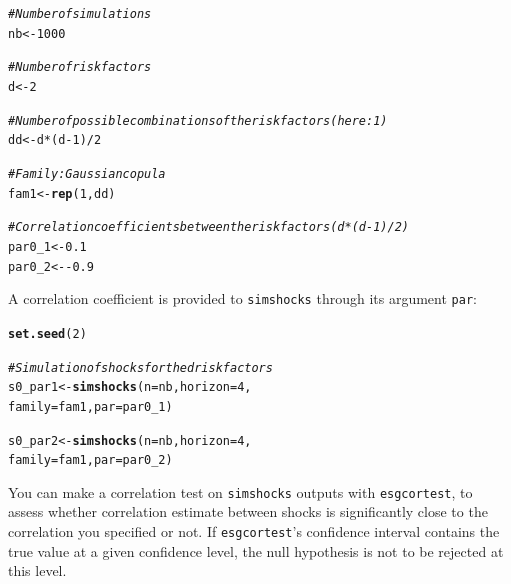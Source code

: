 \documentclass[a4paper]{article}\usepackage[]{graphicx}\usepackage[]{color}
\makeatletter
\newcommand{\hlnum}[1]{\textcolor[rgb]{0.686,0.059,0.569}{#1}}%
\newcommand{\hlcom}[1]{\textcolor[rgb]{0.678,0.584,0.686}{\textit{#1}}}%
\newcommand{\hlopt}[1]{\textcolor[rgb]{0,0,0}{#1}}%
\newcommand{\hlstd}[1]{\textcolor[rgb]{0.345,0.345,0.345}{#1}}%
\newcommand{\hlkwb}[1]{\textcolor[rgb]{0.69,0.353,0.396}{#1}}%
\newcommand{\hlkwc}[1]{\textcolor[rgb]{0.333,0.667,0.333}{#1}}%
\newcommand{\hlkwd}[1]{\textcolor[rgb]{0.737,0.353,0.396}{\textbf{#1}}}%
\newenvironment{kframe}{%
 \def\at@end@of@kframe{}%
 \ifinner\ifhmode%
  \def\at@end@of@kframe{\end{minipage}}%
  \begin{minipage}{\columnwidth}%
 \fi\fi%
 \def\FrameCommand##1{\hskip\@totalleftmargin \hskip-\fboxsep
 \colorbox{shadecolor}{##1}\hskip-\fboxsep
     \hskip-\linewidth \hskip-\@totalleftmargin \hskip\columnwidth}%
 \MakeFramed {\advance\hsize-\width
   \@totalleftmargin\z@ \linewidth\hsize
   \@setminipage}}%
 {\par\unskip\endMakeFramed%
 \at@end@of@kframe}
\newenvironment{knitrout}{}{} %
\newcommand{\code}[1]{\mbox{\texttt{#1}}}
\makeatother
\begin{document}
\begin{knitrout}
\color{fgcolor}\begin{kframe}
\begin{alltt}
\hlcom{# Number of simulations}
\hlstd{nb} \hlkwb{<-} \hlnum{1000}

\hlcom{# Number of risk factors}
\hlstd{d} \hlkwb{<-} \hlnum{2}

\hlcom{# Number of possible combinations of the risk factors (here : 1)}
\hlstd{dd} \hlkwb{<-} \hlstd{d}\hlopt{*}\hlstd{(d}\hlopt{-}\hlnum{1}\hlstd{)}\hlopt{/}\hlnum{2}

\hlcom{# Family : Gaussian copula }
\hlstd{fam1} \hlkwb{<-} \hlkwd{rep}\hlstd{(}\hlnum{1}\hlstd{, dd)}

\hlcom{# Correlation coefficients between the risk factors (d*(d-1)/2)}
\hlstd{par0_1} \hlkwb{<-} \hlnum{0.1}
\hlstd{par0_2} \hlkwb{<-} \hlopt{-}\hlnum{0.9}
\end{alltt}
\end{kframe}
\end{knitrout}


A correlation coefficient is provided to \code{simshocks} through its argument \code{par}:

\begin{knitrout}
\color{fgcolor}\begin{kframe}
\begin{alltt}
\hlkwd{set.seed}\hlstd{(}\hlnum{2}\hlstd{)}

\hlcom{# Simulation of shocks for the d risk factors}
\hlstd{s0_par1} \hlkwb{<-} \hlkwd{simshocks}\hlstd{(}\hlkwc{n} \hlstd{= nb,} \hlkwc{horizon} \hlstd{=} \hlnum{4}\hlstd{,}
\hlkwc{family} \hlstd{= fam1,} \hlkwc{par} \hlstd{= par0_1)}

\hlstd{s0_par2} \hlkwb{<-} \hlkwd{simshocks}\hlstd{(}\hlkwc{n} \hlstd{= nb,} \hlkwc{horizon} \hlstd{=} \hlnum{4}\hlstd{,}
\hlkwc{family} \hlstd{= fam1,} \hlkwc{par} \hlstd{= par0_2)}
\end{alltt}
\end{kframe}
\end{knitrout}

You can make a correlation test on \code{simshocks} outputs with \code{esgcortest}, to assess whether correlation estimate between shocks is significantly close to the correlation you specified or not. If \code{esgcortest}'s confidence interval contains the true value at a given confidence level, the null hypothesis is not to be rejected at this level. 
\end{document}
